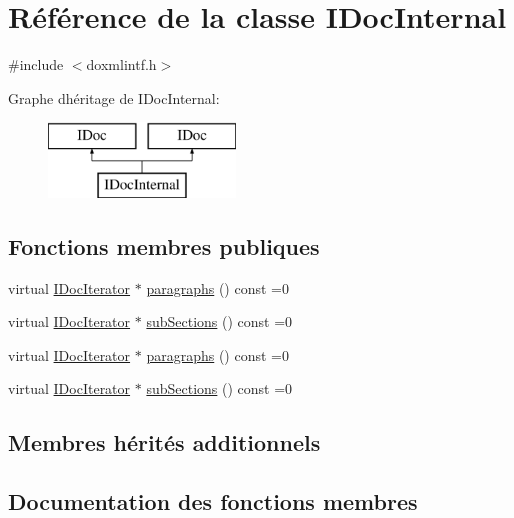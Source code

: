 \hypertarget{class_i_doc_internal}{}\section{Référence de la classe I\+Doc\+Internal}
\label{class_i_doc_internal}


{\ttfamily \#include $<$doxmlintf.\+h$>$}

Graphe d\textquotesingle{}héritage de I\+Doc\+Internal\+:\begin{figure}[H]
\begin{center}
\leavevmode
\includegraphics[height=2.000000cm]{class_i_doc_internal}
\end{center}
\end{figure}
\subsection*{Fonctions membres publiques}
\begin{DoxyCompactItemize}
\item 
virtual \hyperlink{class_i_doc_iterator}{I\+Doc\+Iterator} $\ast$ \hyperlink{class_i_doc_internal_a824f8e3c9917459ce2bd5c024b3945ea}{paragraphs} () const  =0
\item 
virtual \hyperlink{class_i_doc_iterator}{I\+Doc\+Iterator} $\ast$ \hyperlink{class_i_doc_internal_a0fb7e1484841b55ae1192bf1fff0a803}{sub\+Sections} () const  =0
\item 
virtual \hyperlink{class_i_doc_iterator}{I\+Doc\+Iterator} $\ast$ \hyperlink{class_i_doc_internal_a824f8e3c9917459ce2bd5c024b3945ea}{paragraphs} () const  =0
\item 
virtual \hyperlink{class_i_doc_iterator}{I\+Doc\+Iterator} $\ast$ \hyperlink{class_i_doc_internal_a0fb7e1484841b55ae1192bf1fff0a803}{sub\+Sections} () const  =0
\end{DoxyCompactItemize}
\subsection*{Membres hérités additionnels}


\subsection{Documentation des fonctions membres}
\hypertarget{class_i_doc_internal_a824f8e3c9917459ce2bd5c024b3945ea}{}

